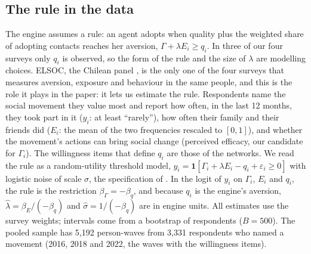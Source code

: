\subsection{The rule in the data}
\label{sec:rule-data}

The engine assumes a rule: an agent adopts when quality plus the weighted share of adopting
contacts reaches her aversion, $\Gamma + \lambda E_i \ge q_i$. In three of our four surveys
only $q_i$ is observed, so the form of the rule and the size of $\lambda$ are modelling choices.
ELSOC, the Chilean panel \citep{elsoc2023}, is the only one of the four surveys that measures
aversion, exposure and behaviour in the same people, and this is the role it plays in the
paper: it lets us estimate the rule. Respondents name the social movement they value most and
report how often, in the last 12 months, they took part in it ($y_i$: at least ``rarely''),
how often their family and their friends did ($E_i$: the mean of the two frequencies rescaled
to $[0, 1]$), and whether the movement's actions can bring social change (perceived efficacy,
our candidate for $\Gamma_i$). The willingness items that define $q_i$ are those of the
networks. We read the rule as a random-utility threshold model, $y_i = \mathbf 1[\Gamma_i +
\lambda E_i - q_i + \varepsilon_i \ge 0]$ with logistic noise of scale $\sigma$, the
specification of \citet{brock2001}. In the logit of $y_i$ on $\Gamma_i$, $E_i$ and $q_i$, the
rule is the restriction $\beta_\Gamma = -\beta_q$, and because $q_i$ is the engine's aversion,
$\hat\lambda = \beta_E/(-\beta_q)$ and $\hat\sigma = 1/(-\beta_q)$ are in engine units. All
estimates use the survey weights; intervals come from a bootstrap of respondents ($B = 500$).
The pooled sample has 5{,}192 person-waves from 3{,}331 respondents who named a movement (2016,
2018 and 2022, the waves with the willingness items).


